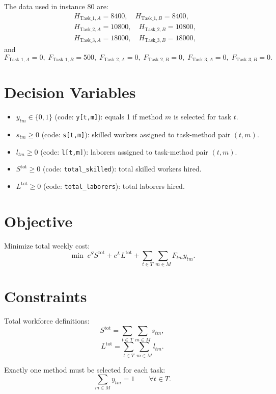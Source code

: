 The data used in instance 80 are:
\[
\begin{aligned}
&H_{\text{Task\_1},A}=8400,\quad H_{\text{Task\_1},B}=8400,\\
&H_{\text{Task\_2},A}=10800,\quad H_{\text{Task\_2},B}=10800,\\
&H_{\text{Task\_3},A}=18000,\quad H_{\text{Task\_3},B}=18000,
\end{aligned}
\]
and
\[
F_{\text{Task\_1},A}=0,\;
F_{\text{Task\_1},B}=500,\;
F_{\text{Task\_2},A}=0,\;
F_{\text{Task\_2},B}=0,\;
F_{\text{Task\_3},A}=0,\;
F_{\text{Task\_3},B}=0.
\]

\section*{Decision Variables}

\begin{itemize}
    \item \(y_{tm}\in\{0,1\}\) (code: \texttt{y[t,m]}): equals 1 if method \(m\) is selected for task \(t\).
    \item \(s_{tm}\ge 0\) (code: \texttt{s[t,m]}): skilled workers assigned to task-method pair \((t,m)\).
    \item \(l_{tm}\ge 0\) (code: \texttt{l[t,m]}): laborers assigned to task-method pair \((t,m)\).
    \item \(S^{\text{tot}}\ge 0\) (code: \texttt{total\_skilled}): total skilled workers hired.
    \item \(L^{\text{tot}}\ge 0\) (code: \texttt{total\_laborers}): total laborers hired.
\end{itemize}

\section*{Objective}

Minimize total weekly cost:
\[
\min \;
c^S S^{\text{tot}} + c^L L^{\text{tot}} + \sum_{t\in T}\sum_{m\in M} F_{tm} y_{tm}.
\]

\section*{Constraints}

Total workforce definitions:
\[
S^{\text{tot}}=\sum_{t\in T}\sum_{m\in M} s_{tm},
\]
\[
L^{\text{tot}}=\sum_{t\in T}\sum_{m\in M} l_{tm}.
\]

Exactly one method must be selected for each task:
\[
\sum_{m\in M} y_{tm}=1
\qquad \forall t\in T.
\]

